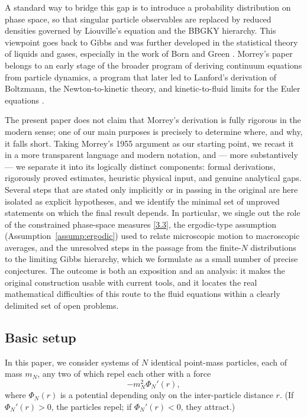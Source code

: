 \documentclass[11pt]{article}
\begin{document}
A standard way to bridge this gap is to introduce a probability distribution on phase space, so that singular particle observables are replaced by reduced densities governed by Liouville's equation and the BBGKY hierarchy. This viewpoint goes back to Gibbs and was further developed in the statistical theory of liquids and gases, especially in the work of Born and Green \cite{BornGreen1949}. Morrey's paper belongs to an early stage of the broader program of deriving continuum equations from particle dynamics, a program that later led to Lanford's derivation of Boltzmann, the Newton-to-kinetic theory, and kinetic-to-fluid limits for the Euler equations \cite{Lanford1975,GallagherSaintRaymondTexier2014,Caflisch1980,BardosGolseLevermore1991,DengHaniMa2025}.

The present paper does not claim that Morrey's derivation is fully rigorous
in the modern sense; one of our main purposes is precisely to determine where,
and why, it falls short. Taking Morrey's 1955 argument as our starting point,
we recast it in a more transparent language and modern notation, and --- more
substantively --- we separate it into its logically distinct components:
formal derivations, rigorously proved estimates, heuristic physical input, and
genuine analytical gaps. Several steps that are stated only implicitly or in
passing in the original are here isolated as explicit hypotheses, and we
identify the minimal set of unproved statements on which the final result
depends. In particular, we single out the role of the constrained phase-space
measures \eqref{3.3}, the ergodic-type assumption (Assumption~\ref{assump:ergodic})
used to relate microscopic motion to macroscopic averages, and the unresolved
steps in the passage from the finite-$N$ distributions to the limiting Gibbs
hierarchy, which we formulate as a small number of precise conjectures. The
outcome is both an exposition and an analysis: it makes the original
construction usable with current tools, and it locates the real mathematical
difficulties of this route to the fluid equations within a clearly delimited
set of open problems.

\subsection{Basic setup }
In this paper, we consider systems of $N$ identical point-mass particles, each of mass $m_N$, any two of which repel each other with a force 
\[
- m_N^2 \Phi_N'(r),
\] 
where $\Phi_N(r)$ is a potential depending only on the inter-particle distance $r$.  
(If $\Phi_N'(r) > 0$, the particles repel; if $\Phi_N'(r) < 0$, they attract.)  
\end{document}
